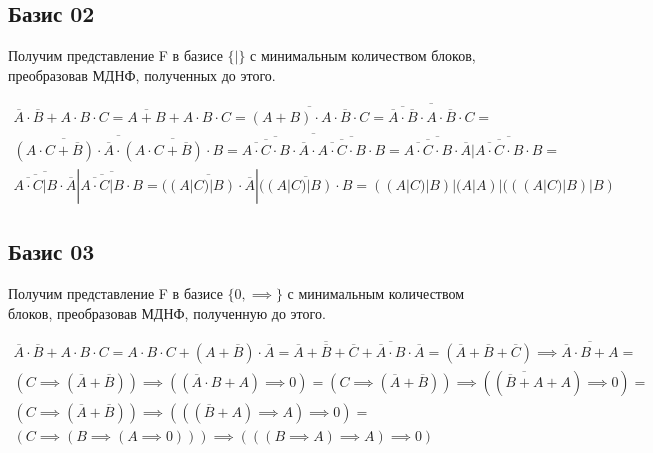 \documentclass[a4paper,10pt]{article} %
\begin{document}
	
	\subsection{Базис 02}
	Получим представление F в базисе $\{|\}$ с минимальным количеством блоков, преобразовав МДНФ, полученных до этого.
	
	\begin{multline*}
	\overline{A} \cdot \overline{B} + A \cdot B \cdot C = 
	\overline{A + B} + A \cdot B \cdot C =
	\overline{(A + B) \cdot \overline{A \cdot B \cdot C}} = 
	\overline{\overline{\overline{A} \cdot \overline{B}}
	\cdot \overline{A \cdot B \cdot C}} = \\ 
	\overline{\overline{(A \cdot C + \overline{B}) \cdot \overline{A}}
	\cdot \overline{(A \cdot C + \overline{B}) \cdot B}} = 
	\overline{\overline{\overline{\overline{A \cdot C} \cdot B} \cdot \overline{A}}
	\cdot \overline{\overline{\overline{A \cdot C} \cdot B} \cdot B}} = 
	\overline{\overline{\overline{A \cdot C} \cdot B} \cdot \overline{A}}
	| \overline{\overline{\overline{A \cdot C} \cdot B} \cdot B} = \\
	\overline{\overline{\overline{A \cdot C} | B} \cdot \overline{A}} 
	| \overline{\overline{\overline{A \cdot C} | B} \cdot B} =
	\overline{((A | C) | B) \cdot \overline{A}} | 
	\overline{((A | C) | B) \cdot B} = 
	((A | C) | B) | (A | A) | 
	(((A | C) | B) | B)
	\end{multline*}
	
	\subsection{Базис 03}
	Получим представление F в базисе $\{0, \implies\}$ с минимальным количеством блоков, преобразовав МДНФ, полученную до этого.
	
	\begin{multline*}
		\overline{A} \cdot \overline{B} + A \cdot B \cdot C = 
		A \cdot B \cdot C + (A + \overline{B}) \cdot \overline{A} = 
		\overline{\overline{A} + \overline{B} + \overline{C}} +
		\overline{\overline{A} \cdot B} \cdot \overline{A} = 
		(\overline{A} + \overline{B} + \overline{C}) \implies 
		\overline{\overline{A} \cdot B + A} = \\
		(C \implies (\overline{A} + \overline{B})) \implies
		((\overline{A} \cdot B + A) \implies 0) =
		(C \implies (\overline{A} + \overline{B})) \implies
		((\overline{\overline{B} + A} + A) \implies 0) = \\
		(C \implies (\overline{A} + \overline{B})) \implies
		(((\overline{B} + A) \implies A) \implies 0) = \\
		(C \implies (B \implies (A \implies 0))) \implies
		(((B \implies A) \implies A) \implies 0)
	\end{multline*}
\end{document}

